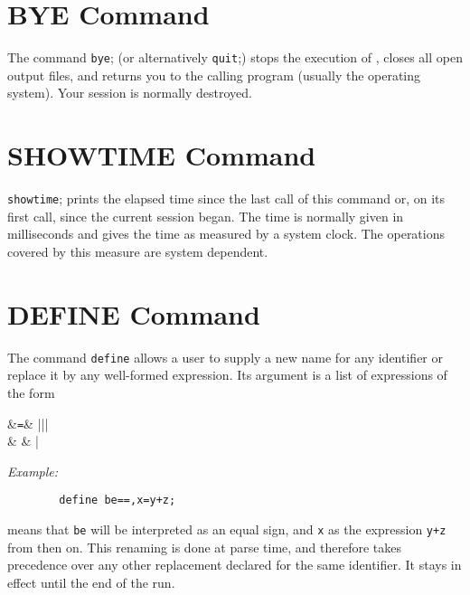 \hypertarget{command:QUIT}{}
\hypertarget{command:BYE}{\section{BYE Command}}

The command \texttt{bye}; (or alternatively \texttt{quit};)
stops the execution
of {\REDUCE}, closes all open output files, and returns you to the calling
program (usually the operating system).  Your {\REDUCE} session is
normally destroyed.

\section{SHOWTIME Command}
\hypertarget{command:SHOWTIME}{}

\texttt{showtime}; prints the elapsed time since the last call of this
command or, on its first call, since the current {\REDUCE} session began.
The time is normally given in milliseconds and gives the time as measured
by a system clock.  The operations covered by this measure are system
dependent.

\section{DEFINE Command}
\hypertarget{command:DEFINE}{}

The command \texttt{define} allows a user to supply a new name for
any identifier or replace it by any well-formed expression.  Its argument
is a list of expressions of the form
\begin{syntaxtable}
   &\texttt{=}& |||\\
                    &          & |
\end{syntaxtable}

\textit{Example:}
\begin{verbatim}
        define be==,x=y+z;
\end{verbatim}
means that \texttt{be} will be interpreted as an equal sign, and \texttt{x}
as the expression \texttt{y+z} from then on.  This renaming is done at parse
time, and therefore takes precedence over any other replacement declared
for the same identifier.  It stays in effect until the end of the
{\REDUCE} run.

